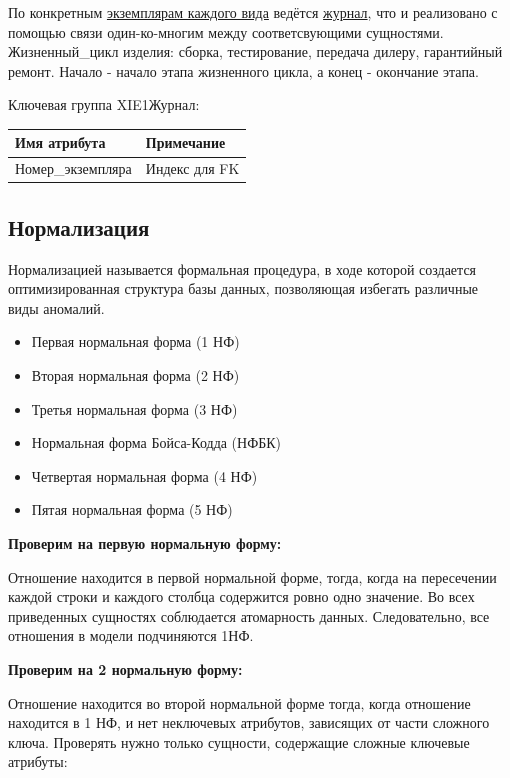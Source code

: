 \begin{enumerate}
\begin{tabular}{|p{7cm}|p{3cm}|p{1cm}|p{1cm}|p{3cm}|}
    \end{tabular}

    По конкретным \underline{экземплярам каждого вида} ведётся \underline{журнал}, что и реализовано с помощью связи один-ко-многим между соответсвующими сущностями.
    Жизненный\_цикл изделия: сборка, тестирование, передача дилеру, гарантийный ремонт.
    Начало - начало этапа жизненного цикла, а конец - окончание этапа.

    Ключевая группа XIE1Журнал:

    \begin{tabular}{|p{7cm}|p{9.3cm}|} \hline

        {\bf Имя атрибута} & {\bf Примечание} \\ \hline
        Номер\_экземпляра & Индекс для FK \\ \hline

    \end{tabular}

\end{enumerate}

\subsection {Нормализация}
Нормализацией называется формальная процедура, в ходе которой создается оптимизированная структура базы данных, позволяющая избегать различные виды аномалий.

\begin{itemize}
    \item Первая нормальная форма (1 НФ)
    \item Вторая нормальная форма (2 НФ)
    \item Третья нормальная форма (3 НФ)
    \item Нормальная форма Бойса-Кодда (НФБК)
    \item Четвертая нормальная форма (4 НФ)
    \item Пятая нормальная форма (5 НФ)
\end{itemize}

{\bf Проверим на первую нормальную форму:}

Отношение находится в первой нормальной форме, тогда, когда на пересечении каждой строки и каждого столбца содержится ровно одно значение.
Во всех приведенных сущностях соблюдается атомарность данных.
Следовательно, все отношения в модели подчиняются 1НФ.

{\bf Проверим на 2 нормальную форму:}

Отношение находится во второй нормальной форме тогда, когда отношение находится в 1 НФ, и нет неключевых атрибутов, зависящих от части сложного ключа.
Проверять нужно только сущности, содержащие сложные ключевые атрибуты:

